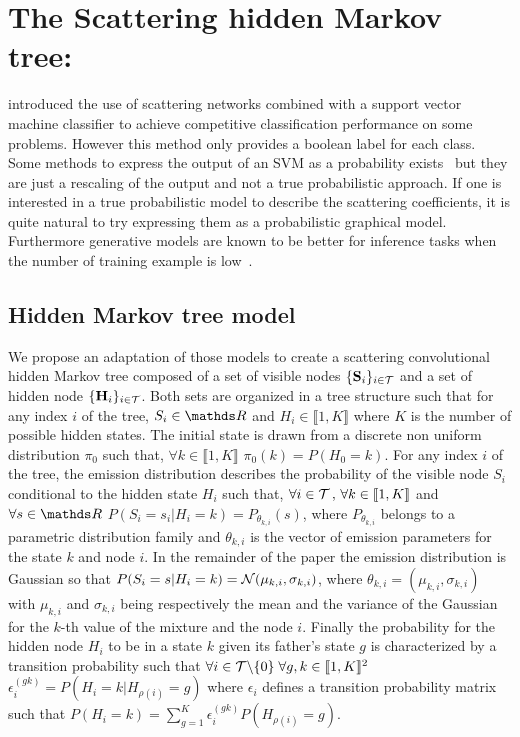 \documentclass{article}
\begin{document}
\section{The Scattering hidden Markov tree:}
\label{sec:SCHMT}

  \cite{Mallat ST} introduced the use of scattering networks combined with a support vector machine classifier to achieve competitive classification performance on some problems. However this method only provides a boolean label for each class. Some methods to express the output of an SVM as a probability exists~\cite{platt1999probabilistic} but they are just a rescaling of the output and not a true probabilistic approach. If one is interested in a true probabilistic model to describe the scattering coefficients, it is quite natural to try expressing them as a probabilistic graphical model. Furthermore generative models are known to be better for inference tasks when the number of training example is low~\cite{jordan2002discriminative}.\\
  
  \subsection{Hidden Markov tree model}
    \label{subsec:SCHMT/HMT model}
    We propose an adaptation of those models to create a scattering convolutional hidden Markov tree composed of a set of visible nodes $\{{\bf S}_{i}\}_{i \in \mathcal{T}}$ and a set of hidden node $\{{\bf H}_{i}\}_{i \in \mathcal{T}}$. Both sets are organized in a tree structure such that for any index $i$ of the tree, $S_{i} \in \dsR$ and $H_{i} \in \llbracket 1,K \rrbracket$ where $K$ is the number of possible hidden states.
    The initial state is drawn from a discrete non uniform distribution $\pi_{0}$ such that, $\forall k \in \llbracket 1,K \rrbracket$ $\pi_{0}(k) = P(H_{0}=k)$.
    For any index $i$ of the tree, the emission distribution describes the probability of the visible node $S_{i}$ conditional to the hidden state $H_{i}$ such that, $\forall i \in \mathcal{T} \, ,\, \forall k \in \llbracket1,K\rrbracket$ and $\forall s \in \dsR$ $P(S_{i}=s_{i}|H_{i}=k) = P_{\theta_{k,i}}(s)$, where $P_{\theta_{k,i}}$ belongs to a parametric distribution family and $\theta_{k,i}$ is the vector of emission parameters for the state $k$ and node $i$. In the remainder of the paper the emission distribution is Gaussian so that $P(S_{i}=s | H_{i}=k) = \mathcal{N}(\mu_{k,i},\sigma_{k,i})$, where $\theta_{k,i}=(\mu_{k,i},\sigma_{k,i})$ with $\mu_{k,i}$ and $\sigma_{k,i}$ being respectively the mean and the variance of the Gaussian for the $k$-th value of the mixture and the node $i$.
    Finally the probability for the hidden node $H_{i}$ to be in a state $k$ given its father's state $g$ is characterized by a transition probability such that $\forall i \in \mathcal{T} \backslash \{ 0 \} \; \forall g,k \in \llbracket1,K\rrbracket^{2}$ $\epsilon_{i}^{(gk)} = P(H_{i}= k | H_{\rho(i)}=g)$ where $\epsilon_{i}$ defines a transition probability matrix such that $P(H_{i}=k) = \sum_{g=1}^{K} \epsilon_{i}^{(gk)} P(H_{\rho(i)}=g)$.\\
\end{document}
